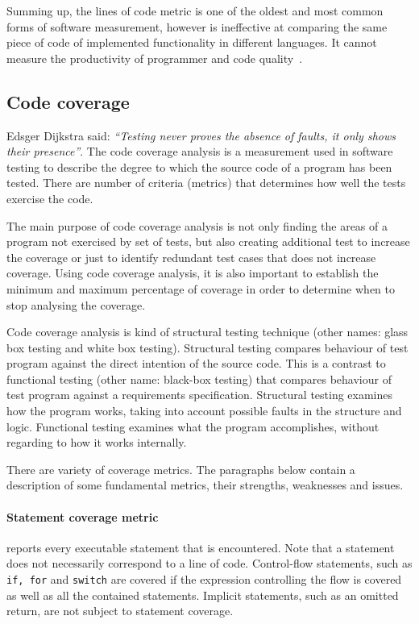 Summing up, the lines of code metric is one of the oldest and most common forms of software measurement, however is ineffective at comparing the same piece of code of implemented functionality in different languages. It cannot measure the productivity of programmer and code quality~\cite{metrics}.

\subsection{Code coverage}
\label{sec:codecoverage}

Edsger Dijkstra said: \textit{``Testing never proves the absence of faults, it only shows their presence''}.
The code coverage analysis is a measurement used in software testing to describe the degree to which the source code of a program has been tested. There are number of criteria (metrics) that determines how well the tests exercise the code.

The main purpose of code coverage analysis is not only finding the areas of a program not exercised by set of tests, but also creating additional test to increase the coverage or just to identify redundant test cases that does not increase coverage. Using code coverage analysis, it is also important to establish the minimum and maximum percentage of coverage in order to determine when to stop analysing the coverage. 

Code coverage analysis is kind of structural testing technique (other names: glass box testing and white box testing). Structural testing compares behaviour of test program against the direct  intention of the source code. This is a contrast to functional testing (other name: black-box testing) that compares behaviour of test program against a requirements specification. Structural testing examines how the program works, taking into account possible faults in the structure and logic. Functional testing examines what the program accomplishes, without regarding to how it works internally.

There are variety of coverage metrics. The paragraphs below contain a description of some fundamental metrics, their strengths, weaknesses and issues. 

\paragraph{Statement coverage metric} reports every executable statement that is encountered.  Note that a statement does not necessarily correspond to a line of code. Control-flow statements, such as \texttt{if, for} and \texttt{switch} are covered if the expression controlling the flow is covered as well as all the contained statements. Implicit statements, such as an omitted return, are not subject to statement coverage. 

